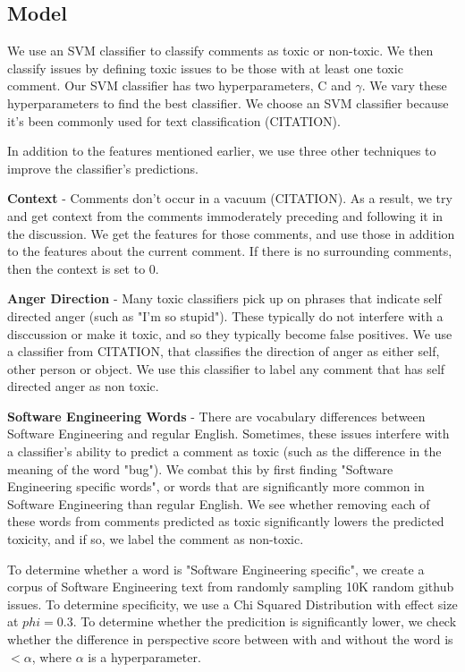 \documentclass[conference]{IEEEtran}
\begin{document}
\subsection{Model} 

We use an SVM classifier to classify comments as toxic or non-toxic. We then classify issues by defining toxic issues to be those with at least one toxic comment. Our SVM classifier has two hyperparameters, C and $\gamma$. We vary these hyperparameters to find the best classifier. We choose an SVM classifier because it's been commonly used for text classification (CITATION). 

In addition to the features mentioned earlier, we use three other techniques to improve the classifier's predictions. 

\textbf{Context} - Comments don't occur in a vacuum (CITATION). As a result, we try and get context from the comments immoderately preceding and following it in the discussion. We get the features for those comments, and use those in addition to the features about the current comment. If there is no surrounding comments, then the context is set to 0. 

\textbf{Anger Direction} - Many toxic classifiers pick up on phrases that indicate self directed anger (such as "I'm so stupid"). These typically do not interfere with a disccussion or make it toxic, and so they typically become false positives. We use a classifier from CITATION, that classifies the direction of anger as either self, other person or object. We use this classifier to label any comment that has self directed anger as non toxic. 

\textbf{Software Engineering Words} - There are vocabulary differences between Software Engineering and regular English. Sometimes, these issues interfere with a classifier's ability to predict a comment as toxic (such as the difference in the meaning of the word "bug"). We combat this by first finding "Software Engineering specific words", or words that are significantly more common in Software Engineering than regular English. We see whether removing each of these words from comments predicted as toxic significantly lowers the predicted toxicity, and if so, we label the comment as non-toxic. 

To determine whether a word is "Software Engineering specific", we create a corpus of Software Engineering text from randomly sampling 10K random github issues. To determine specificity, we use a Chi Squared Distribution with effect size at $phi=0.3$. To determine whether the predicition is significantly lower, we check whether the difference in perspective score between with and without the word is $<\alpha$, where $\alpha$ is a hyperparameter. 
\end{document}
